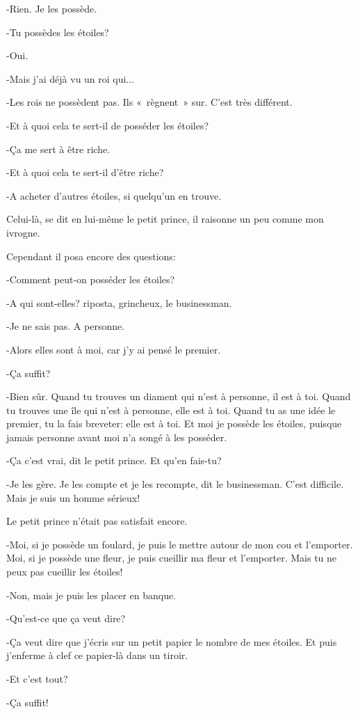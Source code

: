 \documentclass{report}
\begin{document}
-Rien. Je les possède.

-Tu possèdes les étoiles?

-Oui.

-Mais j'ai déjà vu un roi qui...

-Les rois ne possèdent pas. Ils «~règnent~» sur. C'est très différent.

-Et à quoi cela te sert-il de posséder les étoiles?

-Ça me sert à être riche.

-Et à quoi cela te sert-il d'être riche?

-A acheter d'autres étoiles, si quelqu'un en trouve.

Celui-là, se dit en lui-même le petit prince, il raisonne un peu comme mon ivrogne.

Cependant il posa encore des questions:

-Comment peut-on posséder les étoiles?

-A qui sont-elles? riposta, grincheux, le businessman.

-Je ne sais pas. A personne.

-Alors elles sont à moi, car j'y ai pensé le premier.

-Ça suffit?

-Bien sûr. Quand tu trouves un diament qui n'est à personne, il est à toi. Quand tu trouves une île qui n'est à personne, elle est à toi. Quand tu as une idée le premier, tu la fais breveter: elle est à toi. Et moi je possède les étoiles, puisque jamais personne avant moi n'a songé à les posséder.

-Ça c'est vrai, dit le petit prince. Et qu'en fais-tu?

-Je les gère. Je les compte et je les recompte, dit le businessman. C'est difficile. Mais je suis un homme sérieux!

Le petit prince n'était pas satisfait encore.

-Moi, si je possède un foulard, je puis le mettre autour de mon cou et l'emporter. Moi, si je possède une fleur, je puis cueillir ma fleur et l'emporter. Mais tu ne peux pas cueillir les étoiles!

-Non, mais je puis les placer en banque.

-Qu'est-ce que ça veut dire?

-Ça veut dire que j'écris sur un petit papier le nombre de mes étoiles. Et puis j'enferme à clef ce papier-là dans un tiroir.

-Et c'est tout?

-Ça suffit!
\end{document}
